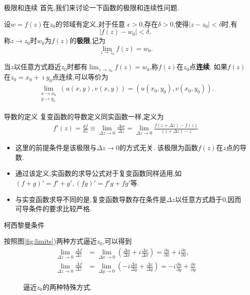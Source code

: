\documentclass[fontset=windows, chinese, 10pt]{beamer}
\begin{document}
\begin{frame}{极限和连续}
  首先,我们来讨论一下函数的极限和连续性问题.
  \begin{definition}
      设$w=f(z)$在$z_0$的邻域有定义,对于任意
  $\epsilon > 0$,存在$\delta > 0$,使得$|z-z_0| < \delta$时,有
  \begin{equation}
      |f(z) - w_0| < \delta ,
  \end{equation}
  称$z\to z_0$时$w_0$为$f(z)$的{\bf 极限},记为
  \begin{equation}
      \lim_{z\to z_0} f(z) = w_0 .
  \end{equation}
  \end{definition}
  当$z$以任意方式趋近$z_0$时都有$ \lim_{z\to z_0} f(z) = w_0$,称$f(z)$在$z_0$点{\bf 连续}.
  如果$f(z)$ 在$z_0=x_0 + \imath y_0$点连续,可以等价为
  \begin{align}
      \lim_{\substack{x\to x_0\\y\to y_0}} \left(u(x,y), v(x,y)\right) = \left(u(x_0, y_0), v(x_0, y_0)\right) . 
  \end{align}
\end{frame}


\begin{frame}{导数的定义}
  复变函数的导数定义同实函数一样,定义为
  \begin{align}
      \label{eq:derivative_def}
      f'(z) = \frac{df}{dz} 
      \equiv\lim_{\Delta z \to 0} \frac{\Delta w} {\Delta z} 
      = \lim_{\Delta z\to 0} \frac{f(z+\Delta z) - f(z) } {(z+\Delta z ) - z}
  \end{align}
  \begin{itemize}
    \item   这里的前提条件是该极限与$\Delta z \to 0$的方式无关.  该极限为函数$f(z)$在$z$点的导数.
    \item  通过该定义,实函数的求导公式对于复变函数同样适用,如
    $(f+g)' = f' + g', (fg)' =f'g + fg'$等. 
    \item   与实变函数求导不同的是,复变函数导数存在条件是$\Delta z$以任意方式趋于$0$,因而可导条件的要求比较严格.
  \end{itemize}

\end{frame}

\begin{frame}{柯西黎曼条件}


按照图\eqref{fig:limits})两种方式逼近$z_0$,可以得到
\begin{align}
    \lim _{\Delta z \rightarrow 0} \frac{\Delta f}{\Delta z} &=\lim _{\Delta x \rightarrow 0}\left(\frac{\Delta u}{\Delta x}+i \frac{\Delta v}{\Delta x}\right)=\frac{\partial u}{\partial x}+i \frac{\partial v}{\partial x},
\\
    \lim _{\Delta z \rightarrow 0} \frac{\Delta f}{\Delta z} &=\lim _{\Delta y \rightarrow 0}\left(-i \frac{\Delta u}{\Delta y}+\frac{\Delta v}{\Delta y}\right)=-i \frac{\partial u}{\partial y}+\frac{\partial v}{\partial y}
\end{align}
\begin{figure}
  \centering
  
  \caption{逼近$z_0$的两种特殊方式.}
  \label{fig:limits}
\end{figure}
\end{frame}
\end{document}
